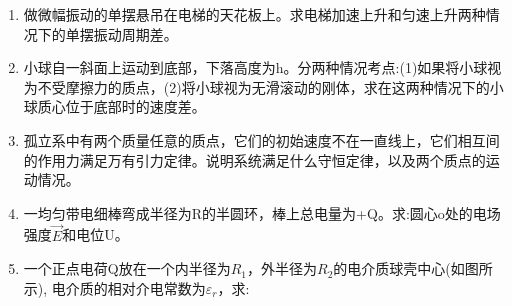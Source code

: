 
\begin{enumerate}
\item 做微幅振动的单摆悬吊在电梯的天花板上。求电梯加速上升和匀速上升两种情况下的单摆振动周期差。
\item 小球自一斜面上运动到底部，下落高度为h。分两种情况考点:(1)如果将小球视为不受摩擦力的质点，(2)将小球视为无滑滚动的刚体，求在这两种情况下的小球质心位于底部时的速度差。
\item 孤立系中有两个质量任意的质点，它们的初始速度不在一直线上，它们相互间的作用力满足万有引力定律。说明系统满足什么守恒定律，以及两个质点的运动情况。
\item 一均匀带电细棒弯成半径为R的半圆环，棒上总电量为+Q。求:圆心o处的电场强度$\vec E$和电位U。
\item 一个正点电荷Q放在一个内半径为$R_1$，外半径为$R_2$的电介质球壳中心(如图所示),
电介质的相对介电常数为$\varepsilon_r$，求:
\end{enumerate}